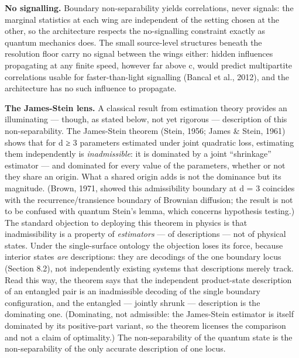 \documentclass[
]{article}
\begin{document}
\textbf{No signalling.} Boundary non-separability yields correlations,
never signals: the marginal statistics at each wing are independent of
the setting chosen at the other, so the architecture respects the
no-signalling constraint exactly as quantum mechanics does. The small
source-level structures beneath the resolution floor carry no signal
between the wings either: hidden influences propagating at any finite
speed, however far above c, would predict multipartite correlations
usable for faster-than-light signalling (Bancal et al., 2012), and the
architecture has no such influence to propagate.

\textbf{The James-Stein lens.} A classical result from estimation theory
provides an illuminating --- though, as stated below, not yet rigorous
--- description of this non-separability. The James-Stein theorem
(Stein, 1956; James \& Stein, 1961) shows that for d ≥ 3 parameters
estimated under joint quadratic loss, estimating them independently is
\emph{inadmissible}: it is dominated by a joint ``shrinkage'' estimator
--- and dominated for every value of the parameters, whether or not they
share an origin. What a shared origin adds is not the dominance but its
magnitude. (Brown, 1971, showed this admissibility boundary at d = 3
coincides with the recurrence/transience boundary of Brownian diffusion;
the result is not to be confused with quantum Stein's lemma, which
concerns hypothesis testing.) The standard objection to deploying this
theorem in physics is that inadmissibility is a property of
\emph{estimators} --- of descriptions --- not of physical states. Under
the single-surface ontology the objection loses its force, because
interior states \emph{are} descriptions: they are decodings of the one
boundary locus (Section 8.2), not independently existing systems that
descriptions merely track. Read this way, the theorem says that the
independent product-state description of an entangled pair is an
inadmissible decoding of the single boundary configuration, and the
entangled --- jointly shrunk --- description is the dominating one.
(Dominating, not admissible: the James-Stein estimator is itself
dominated by its positive-part variant, so the theorem licenses the
comparison and not a claim of optimality.) The non-separability of the
quantum state is the non-separability of the only accurate description
of one locus.
\end{document}
